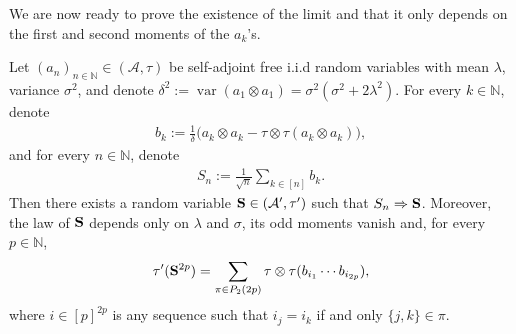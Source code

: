 \documentclass[12pt,reqno]{amsart}
\theoremstyle{plain}
\newcommand{\1}{\mathbf{1}}
\newcommand{\var}{\operatorname{var}}
\newcommand{\N}{\mathbb{N}}
\newcommand{\A}{\mathcal{A}}
\begin{document}
We are now ready to prove the existence of the limit and that it only depends on the first and second moments of the $a_k$'s.

\begin{proposition}[Existence]\label{proposition: existence of the limit}
    Let $(a_n)_{n\in \N} \in (\A,\tau)$ be self-adjoint free i.i.d random variables with mean $\lambda$,  variance $\sigma^2$, and denote $\delta^2:=\var(a_1\otimes a_1)= \sigma^2(\sigma^2+2\lambda^2)$. For every $k\in \N$, denote 
    \begin{align*}
        b_k:=\frac{1}{\delta}\big(a_k\otimes a_k-\tau\otimes \tau(a_k\otimes a_k)\big),
    \end{align*}
    and for every $n\in\N$, denote
    \begin{align*}
        S_n:=\frac{1}{\sqrt{n}}\sum_{k \in [n]}b_k.
    \end{align*}
    Then there exists a random variable ${\bf{S}} \in (\A',\tau')$ such that $S_n\Rightarrow {\bf{S}}$. Moreover, the law of ${\bf{S}}$ depends only on $\lambda$ and $\sigma$, its odd moments vanish and, for every $p\in\N$, 
    \begin{align*}
        \tau'({\bf{S}}^{2p})=\sum_{\pi \in P_2(2p)}\tau\otimes \tau(b_{i_1}\cdots b_{i_{2p}}),
    \end{align*}
    where  $i \in [p]^{2p}$ is any sequence such that $i_j=i_k$ if and only $\{j,k\} \in \pi$.
\end{proposition}
\end{document}
